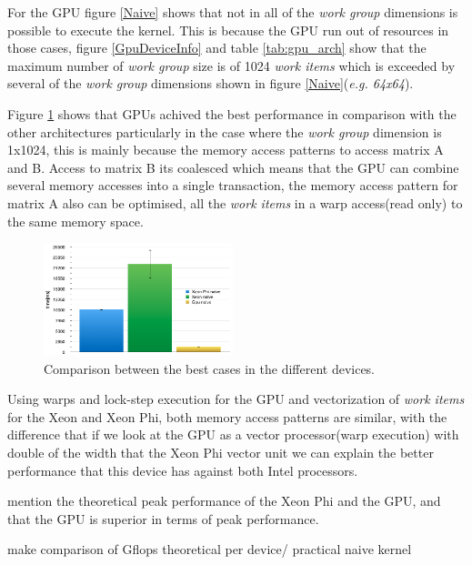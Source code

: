\par{For the GPU figure \ref{Naive} shows that not in all of the 
    \emph{work group} dimensions is possible to execute the kernel. 
    This is because the GPU run out of resources in those cases\cite{opencl_error},
    figure \ref{GpuDeviceInfo} and table \ref{tab:gpu_arch} show that the 
    maximum number of \emph{work group} size is of 1024 \emph{work items} which
    is exceeded by several of the \emph{work group} dimensions shown in figure 
    \ref{Naive}(\emph{e.g. 64x64}).}

\par{Figure \ref{NaiveRes} shows that GPUs achived the best performance in 
    comparison with the other architectures particularly
    in the case where the \emph{work group} dimension is 1x1024,
    this is mainly because the memory access patterns to access matrix A and B. 
    Access to matrix B its coalesced which means that the GPU can combine several 
    memory accesses into a single transaction, the memory access pattern for matrix 
    A also can be optimised, all the \emph{work items} in a warp access(read only)
    to the same memory space}.

\begin{figure}[!h]
    \centering
    \includegraphics[width=0.49\textwidth]{figures/naiveRes.png}
    \caption{Comparison between the best cases in the different devices.}
    \label{NaiveRes}
\end{figure}

\par{Using warps and lock-step execution for the 
    GPU and vectorization of \emph{work items} for the Xeon and Xeon Phi, both
    memory access patterns are similar, with the difference that if we look at
    the GPU as a vector processor(warp execution) with double of the width that the
    Xeon Phi vector unit we can explain the better performance that this device 
    has against both Intel processors.}

\par{{\color{red} mention the theoretical peak performance of the Xeon Phi and 
    the GPU, and that the GPU is superior in terms of peak performance.}}

\par{{\color{red} make comparison of Gflops theoretical per device/ practical
    naive kernel}}




